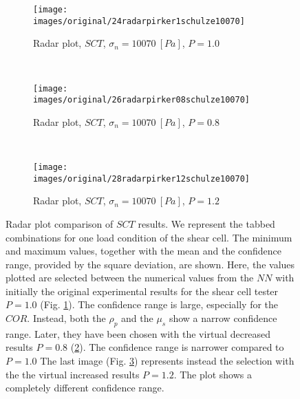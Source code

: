 \begin{figure}[htp] \centering
    \begin{subfigure}[b]{0.96\columnwidth}
        \texttt{[image: images/original/24radarpirker1schulze10070]}
        \caption{Radar plot, $SCT$, $\sigma_n=10070 ~[Pa]$, $P=1.0$}
        \label{fig:24radarpirker1schulze10070}
    \end{subfigure} \\
        \begin{subfigure}[b]{0.96\columnwidth}
        \texttt{[image: images/original/26radarpirker08schulze10070]}
        \caption{Radar plot, $SCT$, $\sigma_n=10070 ~[Pa]$, $P=0.8$}
        \label{fig:26radarpirker08schulze10070} 
    \end{subfigure}\\
        \begin{subfigure}[b]{0.96\columnwidth}
        \texttt{[image: images/original/28radarpirker12schulze10070]}
        \caption{Radar plot, $SCT$, $\sigma_n=10070 ~[Pa]$, $P=1.2$}
        \label{fig:28radarpirker12schulze10070} 
    \end{subfigure}
    \caption[Radar plot comparison of SCT results]{Radar plot comparison of
    $SCT$ results. We represent the tabbed combinations for one load condition
    of the shear cell. The minimum and maximum values, together with the mean and the confidence
	range, provided by the square deviation, are shown.
    Here, the values plotted are selected between the numerical
    values from the $NN$ with initially the original experimental results for the shear cell tester $P=1.0$ (Fig.
    \ref{fig:24radarpirker1schulze10070}). 
    The confidence range is large, especially for the $COR$.
    Instead, both the $\rho_p$  and the $\mu_s$ show a narrow confidence range. 
    Later, they have been chosen with  
    the virtual decreased results $P=0.8$
    (\ref{fig:26radarpirker08schulze10070}).
    The confidence range is narrower compared to $P=1.0$
    The last image (Fig. \ref{fig:28radarpirker12schulze10070}) represents
    instead the selection with the the virtual increased results $P=1.2$.
    The plot shows a completely different confidence range.    }
    \label{fig:29schulzeradarandcloud}
\end{figure}
